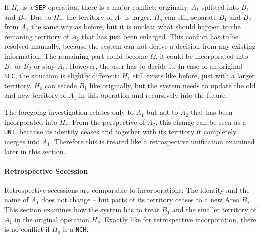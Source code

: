 If $H_o$ is a \texttt{SEP} operation, there is a major conflict: originally, $A_1$ splitted into $B_1$ and $B_2$. Due to $H_r$, the territory of $A_1$ is larger. $H_o$ can still separate $B_1$ and $B_2$ from $A_1$ the same way as before, but it is unclear what should happen to the remaning territory of $A_1$ that has just been enlarged. This conflict has to be resolved manually, because the system can not derive a decision from any existing information. The remaining part could become $\Omega$, it could be incorporated into $B_1$ or $B_2$ or stay $A_1$. However, the user has to decide it. In case of an original \texttt{SEC}, the situation is slightly different: $H_1$ still exists like before, just with a larger territory. $H_o$ can secede $B_1$ like originally, but the system needs to update the old and new territory of $A_1$ in this operation and recursively into the future.

The foregoing investigation relates only to $A_1$ but not to $A_2$ that has been incorporated into $H_r$. From the perspective of $A_2$, this change can be seen as a \texttt{UNI}, because its identity ceases and together with its territory it completely merges into $A_1$. Therefore this is treated like a retrospective unification examined later in this section.


\paragraph{Retrospective Secession} %
\label{par:retrospective_secession}

Retrospective secessions are comparable to incorporations: The identity and the name of $A_1$ does not change -- but parts of its territory ceases to a new Area $B_1$. This section examines how the system has to treat $B_1$ and the smaller territory of $A_1$ in the original operation $H_o$. Exactly like for retrospective incorporation, there is no conflict if $H_o$ is a \texttt{NCH}.

